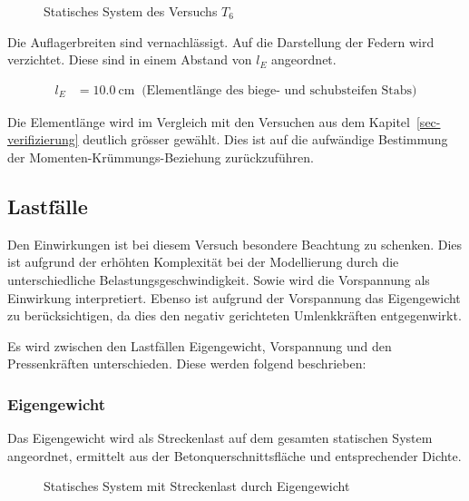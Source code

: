 \documentclass[
  11pt,
  letterpaper,
]{scrreprt}
\begin{document}
\begin{figure}[H]


\caption{\label{fig-system_t6}Statisches System des Versuchs \(T_6\)}

\end{figure}%

Die Auflagerbreiten sind vernachlässigt. Auf die Darstellung der Federn
wird verzichtet. Diese sind in einem Abstand von \(l_E\) angeordnet.

$$
\begin{aligned}
l_{E} &= 10.0\ \mathrm{cm} \; \;\textrm{(Elementlänge des biege- und schubsteifen Stabs)}
\end{aligned}
$$

Die Elementlänge wird im Vergleich mit den Versuchen aus dem
Kapitel~\ref{sec-verifizierung} deutlich grösser gewählt. Dies ist auf
die aufwändige Bestimmung der Momenten-Krümmungs-Beziehung
zurückzuführen.

\subsection{Lastfälle}\label{lastfuxe4lle}

Den Einwirkungen ist bei diesem Versuch besondere Beachtung zu schenken.
Dies ist aufgrund der erhöhten Komplexität bei der Modellierung durch
die unterschiedliche Belastungsgeschwindigkeit. Sowie wird die
Vorspannung als Einwirkung interpretiert. Ebenso ist aufgrund der
Vorspannung das Eigengewicht zu berücksichtigen, da dies den negativ
gerichteten Umlenkkräften entgegenwirkt.

Es wird zwischen den Lastfällen Eigengewicht, Vorspannung und den
Pressenkräften unterschieden. Diese werden folgend beschrieben:

\subsubsection{Eigengewicht}\label{eigengewicht}

Das Eigengewicht wird als Streckenlast auf dem gesamten statischen
System angeordnet, ermittelt aus der Betonquerschnittsfläche und
entsprechender Dichte.

\begin{figure}[H]


\caption{\label{fig-t6_lastfall_eg}Statisches System mit Streckenlast
durch Eigengewicht}

\end{figure}%
\end{document}
